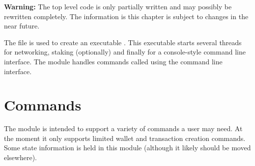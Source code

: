 {\bf{Warning:}} The top level code is only partially written and may possibly be rewritten completely.
The information is this chapter is subject to changes in the near future.

The file {} is
used to create an executable
{}.
This executable starts several threads for networking, staking (optionally)
and finally for a console-style command line interface.
The module {} handles commands called using the command line
interface.

\section{Commands}

The module {} is intended to support a variety of commands a user may need.
At the moment it only supports limited wallet and transaction creation commands.
Some state information is held in this module (although it likely should be moved elsewhere).
